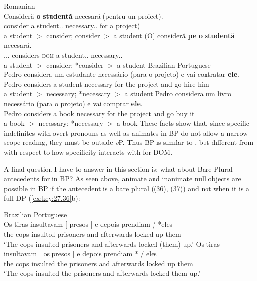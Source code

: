 \documentclass[output=paper]{langsci/langscibook}
\begin{document}
\ea\label{ex:key:27.34} Romanian\\
    \ea
        \gll Consideră \textbf{o}    \textbf{studentă} necesară       (pentru un proiect).\\
        consider     a   student.\glossF.\Sg{} necessary.\glossF.\Sg{}   \hphantom{(}for a project)\\
        \glt a student $>$ consider; consider $>$ a student
    \ex
        \gll (O)      consideră \textbf{pe} \textbf{o} \textbf{studentă} necesară.\\
        \hphantom{(}\Cl.\Tsg.\glossF.\Acc{} considers  \textsc{dom}  a student.\glossF.\Sg{}        necessary.\glossF.\Sg{}\\
        \glt a student $>$ consider; *consider $>$ a student
    \z
\z
\newpage
\ea\label{ex:key:27.35} Brazilian Portuguese\\
    \ea
        \gll Pedro considera um estudante necessário (para o projeto) e     vai contratar \textbf{ele}.\\
              Pedro considers a    student      necessary     \hphantom{(}for   the project and go   hire         him\\
        \glt a student $>$ necessary; *necessary $>$ a student
    \ex
        \gll Pedro  considera um   livro   necessário   (para o projeto) e vai   comprar \textbf{ele}.\\
            Pedro   considers a       book   necessary   \hphantom{(}for   the   project and go     buy         it\\
        \glt a book $>$ necessary; *necessary $>$ a book
    \z
\z
These facts show that, since specific indefinites with overt pronouns as well
as animates in \gls{BP} do not allow a narrow scope reading, they must be outside
\emph{v}P. Thus \gls{BP} is similar to , but different from  with
respect to how specificity interacts with  for DOM\@.

A final question I have to answer in this section is: what about Bare Plural
antecedents for  in BP\@? As seen above, animate and
inanimate null objects are possible in \gls{BP} if the
antecedent is a bare plural ((36), (37)) and not when it is a full DP
(\ref{ex:key:27.36}b):

\ea\label{ex:key:27.36} Brazilian Portuguese\\
    \ea
        \gll Os   tiras    insultavam [ presos ] e depois prendiam \underline{\hphantom{eles}} / *eles\\
          the   cops   insulted {} prisoners {} and   afterwards {locked up} {} {} \hphantom{*}them\\
        \glt  `The cops insulted prisoners and afterwards locked (them) up.'
    \ex
        \gll Os   tiras   insultavam   [ os presos ] e depois prendiam *\underline{\hphantom{eles}} / eles\\
           the  cops  insulted {} the prisoners {} and afterwards {locked up} {} {} them\\
        \glt `The cops insulted the prisoners and afterwards locked them up.'
    \z
\z
\end{document}
